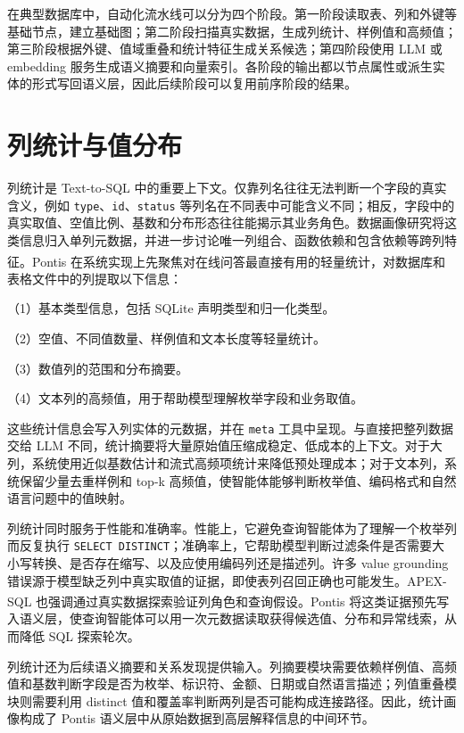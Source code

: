 \documentclass[
    bachelor,
    pdflinks,
]{xjtuthesis}
\newcommand{\upcite}[1]{\textsuperscript{\cite{#1}}}
\begin{document}
在典型数据库中，自动化流水线可以分为四个阶段。第一阶段读取表、列和外键等基础节点，建立基础图；第二阶段扫描真实数据，生成列统计、样例值和高频值；第三阶段根据外键、值域重叠和统计特征生成关系候选；第四阶段使用 LLM 或 embedding 服务生成语义摘要和向量索引。各阶段的输出都以节点属性或派生实体的形式写回语义层，因此后续阶段可以复用前序阶段的结果。

\section{列统计与值分布}

列统计是 Text-to-SQL 中的重要上下文。仅靠列名往往无法判断一个字段的真实含义，例如 \texttt{type}、\texttt{id}、\texttt{status} 等列名在不同表中可能含义不同；相反，字段中的真实取值、空值比例、基数和分布形态往往能揭示其业务角色。数据画像研究将这类信息归入单列元数据，并进一步讨论唯一列组合、函数依赖和包含依赖等跨列特征\upcite{abedjan2015profiling}。Pontis 在系统实现上先聚焦对在线问答最直接有用的轻量统计，对数据库和表格文件中的列提取以下信息：

（1）基本类型信息，包括 SQLite 声明类型和归一化类型。

（2）空值、不同值数量、样例值和文本长度等轻量统计。

（3）数值列的范围和分布摘要。

（4）文本列的高频值，用于帮助模型理解枚举字段和业务取值。

这些统计信息会写入列实体的元数据，并在 \texttt{meta} 工具中呈现。与直接把整列数据交给 LLM 不同，统计摘要将大量原始值压缩成稳定、低成本的上下文。对于大列，系统使用近似基数估计和流式高频项统计来降低预处理成本；对于文本列，系统保留少量去重样例和 top-k 高频值，使智能体能够判断枚举值、编码格式和自然语言问题中的值映射。

列统计同时服务于性能和准确率。性能上，它避免查询智能体为了理解一个枚举列而反复执行 \texttt{SELECT DISTINCT}；准确率上，它帮助模型判断过滤条件是否需要大小写转换、是否存在缩写、以及应使用编码列还是描述列。许多 value grounding 错误源于模型缺乏列中真实取值的证据，即使表列召回正确也可能发生。APEX-SQL 也强调通过真实数据探索验证列角色和查询假设\upcite{cao2026apexsql}。Pontis 将这类证据预先写入语义层，使查询智能体可以用一次元数据读取获得候选值、分布和异常线索，从而降低 SQL 探索轮次。

列统计还为后续语义摘要和关系发现提供输入。列摘要模块需要依赖样例值、高频值和基数判断字段是否为枚举、标识符、金额、日期或自然语言描述；列值重叠模块则需要利用 distinct 值和覆盖率判断两列是否可能构成连接路径。因此，统计画像构成了 Pontis 语义层中从原始数据到高层解释信息的中间环节。
\end{document}
